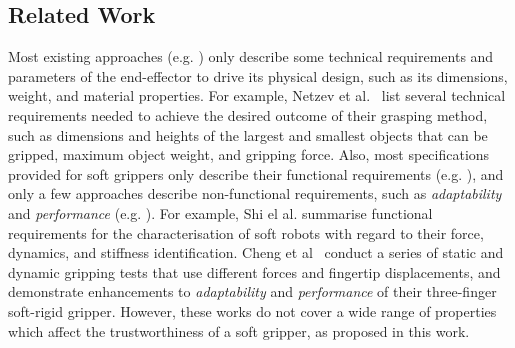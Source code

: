 \documentclass[letterpaper, 10 pt, conference]{ieeeconf}  %
\begin{document}
	\subsection{Related Work}\label{relatedwork}
	Most existing approaches (e.g. \cite{Netzev2023,Hong2022,Bhattacharya2019,Tadakuma2020,Loh2014,Nishikawa2019,Mohan2020}) only describe some technical requirements and parameters of the end-effector to drive its physical design, such as its dimensions, weight, and material properties. For example, Netzev et al.~\cite{Netzev2023} list several technical requirements needed to achieve the desired outcome of their grasping method, such as dimensions and heights of the largest and smallest objects that can be gripped, maximum object weight, and gripping force. 
	Also, most specifications provided for soft grippers only describe their functional requirements (e.g. \cite{Shi2023}), and only a few approaches describe non-functional requirements, such as \emph{adaptability} and \emph{performance} (e.g. \cite{Cheng2021,Liu2021,Chen2018,Cai2021,Hwang2020,Shin2021}).  
	For example, Shi el al. \cite{Shi2023} summarise functional requirements for the characterisation of soft robots with regard to
	their force, dynamics, and stiffness identification. 
	Cheng et al~\cite{Cheng2021} conduct a series of static and dynamic gripping tests that use different forces and fingertip displacements, and demonstrate enhancements to \emph{adaptability} and \emph{performance} of their three-finger soft-rigid gripper. %
	However, these works do not cover a wide range of properties which affect the trustworthiness of a soft gripper, as proposed in this work.  
	
	
	
\end{document}
